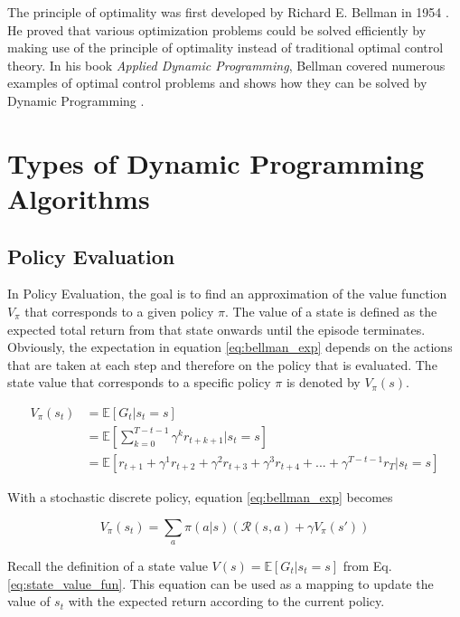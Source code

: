 The principle of optimality was first developed by Richard E. Bellman in 1954 \cite{Bellman1954}. He proved that various optimization problems could be solved efficiently by making use of the principle of optimality instead of traditional optimal control theory. In his book \textit{Applied Dynamic Programming}, Bellman covered numerous examples of optimal control problems and shows how they can be solved by Dynamic Programming \cite{Bellman1962}.

\section{Types of Dynamic Programming Algorithms}

\subsection{Policy Evaluation}
\label{subsection:policy_evaluation}

In Policy Evaluation, the goal is to find an approximation of the value function $V_\pi$ that corresponds to a given policy $\pi$. The value of a state is defined as the expected total return from that state onwards until the episode terminates. Obviously, the expectation in equation \ref{eq:bellman_exp} depends on the actions that are taken at each step and therefore on the policy that is evaluated. The state value that corresponds to a specific policy $\pi$ is denoted by $V_\pi(s)$.

\begin{align}
V_\pi(s_t)&=\mathbb{E}[G_t|s_t=s]\\ &= \mathbb{E}\left[ \sum_{k=0}^{T-t-1}\gamma^k r_{t+k+1}|s_t=s\right] \\
&=\mathbb{E}[r_{t+1}+\gamma^1 r_{t+2}+\gamma^2 r_{t+3}+\gamma^3 r_{t+4}+...+\gamma^{T-t-1}r_T|s_t=s]
\label{eq:bellman_exp}
\end{align}

With a stochastic discrete policy, equation \ref{eq:bellman_exp} becomes

\begin{equation}
V_\pi(s_t)=\sum_{a}\pi(a|s)(\mathcal{R}(s,a)+\gamma V_\pi(s'))
\label{eq:bellman_exp_discrete_policy}
\end{equation}

Recall the definition of a state value $V(s) = \mathbb{E}[G_t|s_t=s]$ from Eq. \ref{eq:state_value_fun}. This equation can be used as a mapping to update the value of $s_t$ with the expected return according to the current policy.

